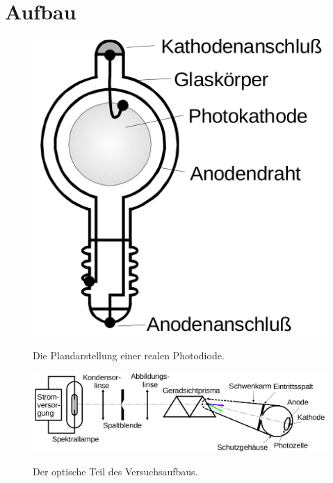 \section{Aufbau}
\label{sec:Aufbau}

\begin{figure}
	\centering
	\caption{Die Plandarstellung einer realen Photodiode.}
	\includegraphics[width=\linewidth-280pt,height=\textheight-280pt,keepaspectratio]{content/Bilder/Photodiodereal.png}
	\label{fig:photodiodereal}
\end{figure}
\begin{figure}
	\centering
	\caption{Der optische Teil des Versuchsaufbaus.}
	\includegraphics[width=\linewidth-70pt,height=\textheight-70pt,keepaspectratio]{content/Bilder/Optikteil.png}
	\label{fig:optikteil}
\end{figure}
